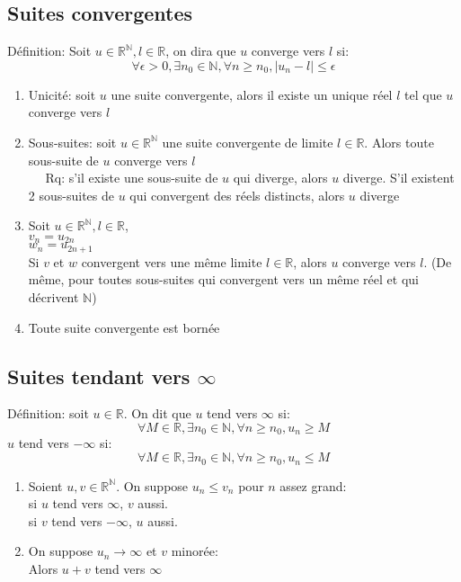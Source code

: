 \documentclass[fleqn]{article}
\begin{document}
\subsection{Suites convergentes}
D\'efinition: Soit $u \in \mathbb{R}^\mathbb{N}, l \in \mathbb{R}$, on dira que $u$ converge vers $l$ si:
\[\forall \epsilon > 0, \exists n_0 \in \mathbb{N}, \forall n \geq n_0, |u_n - l| \leq \epsilon\]
\begin{enumerate}
	\item Unicit\'e: soit $u$ une suite convergente, alors il existe un unique r\'eel $l$ tel que $u$ converge vers $l$
	\item Sous-suites: soit $u \in \mathbb{R}^\mathbb{N}$ une suite convergente de limite $l \in \mathbb{R}$. Alors toute sous-suite
	de $u$ converge vers $l$ \\
	$\quad$ Rq: s'il existe une sous-suite de $u$ qui diverge, alors $u$ diverge. S'il existent 2 sous-suites de $u$ qui convergent des
	r\'eels distincts, alors $u$ diverge
	\item Soit $u \in \mathbb{R}^\mathbb{N}, l \in \mathbb{R}$, \\
			$v_n = u_{2n}$ \\
			$w_n = u_{2n+1}$ \\
		Si $v$ et $w$ convergent vers une m\^eme limite $l \in \mathbb{R}$, alors $u$ converge vers $l$.
		(De m\^eme, pour toutes sous-suites qui convergent vers un m\^eme r\'eel et qui d\'ecrivent $\mathbb{N}$)
	\item Toute suite convergente  est born\'ee
\end{enumerate}

\subsection{Suites tendant vers $\infty$}
D\'efinition: soit $u \in \mathbb{R}$. On dit que $u$ tend vers $\infty$ si:
\[\forall M \in \mathbb{R}, \exists n_0 \in \mathbb{N}, \forall n \geq n_0, u_n \geq M\]
$u$ tend vers $-\infty$ si:
\[\forall M \in \mathbb{R}, \exists n_0 \in \mathbb{N}, \forall n \geq n_0, u_n \leq M\]
\begin{enumerate}
	\item Soient $u, v \in \mathbb{R}^\mathbb{N}$. On suppose $u_n \leq v_n$ pour $n$ assez grand: \\
		si $u$ tend vers $\infty$, $v$ aussi. \\
		si $v$ tend vers $-\infty$, $u$ aussi.
	\item On suppose $u_n \rightarrow \infty$ et $v$ minor\'ee: \\
		Alors $u+v$ tend vers $\infty$
\end{enumerate}
\end{document}
